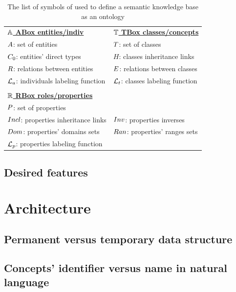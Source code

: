 \begin{table}[ht!]
\caption{The list of symbols of used to define a semantic knowledge base as an ontology }
\label{tab:onto_symboles}
\begin{tabular}{ll}
{\ul \textbf{$\mathbb{A}$ ABox entities/indiv}} & {\ul \textbf{$\mathbb{T}$ TBox classes/concepts}}  \\
$A$: set of entities               & $T$: set of classes  \\
$C_0$: entities' direct types        & $H$: classes inheritance links \\
$R$: relations between entities    & $E$: relations between classes  \\
$\mathcal{L}_a$: individuals labeling function & $\mathcal{L}_t$: classes labeling function \\
 & \\
\multicolumn{2}{l}{{\ul \textbf{$\mathbb{R}$ RBox roles/properties}}}                          \\
$P$: set of properties              &                                              \\
$Incl$: properties inheritance links       & $Inv$: properties inverses                   \\
$Dom$: properties' domains sets     & $Ran$: properties' ranges sets   \\
$\mathcal{L}_p$: properties labeling function & \\
\end{tabular}
\end{table}

\subsection{Desired features}


\section{Architecture}

\subsection{Permanent versus temporary data structure}

\subsection{Concepts' identifier versus name in natural language}

